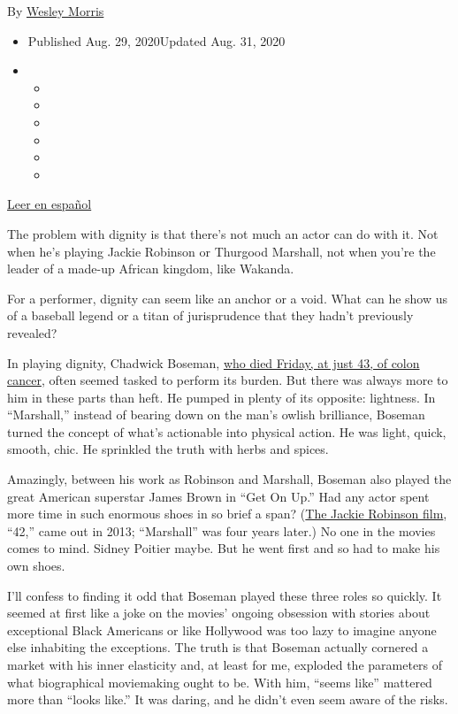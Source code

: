 By \href{https://www.nytimes3xbfgragh.onion/by/wesley-morris}{Wesley
Morris}

\begin{itemize}
\item
  Published Aug. 29, 2020Updated Aug. 31, 2020
\item
  \begin{itemize}
  \item
  \item
  \item
  \item
  \item
  \item
  \end{itemize}
\end{itemize}

\href{https://www.nytimes3xbfgragh.onion/es/2020/09/01/espanol/cultura/chadwick-boseman.html}{Leer
en español}

The problem with dignity is that there's not much an actor can do with
it. Not when he's playing Jackie Robinson or Thurgood Marshall, not when
you're the leader of a made-up African kingdom, like Wakanda.

For a performer, dignity can seem like an anchor or a void. What can he
show us of a baseball legend or a titan of jurisprudence that they
hadn't previously revealed?

In playing dignity, Chadwick Boseman,
\href{https://www.nytimes3xbfgragh.onion/2020/08/28/movies/chadwick-boseman-dead.html}{who
died Friday, at just 43, of colon cancer}, often seemed tasked to
perform its burden. But there was always more to him in these parts than
heft. He pumped in plenty of its opposite: lightness. In ``Marshall,''
instead of bearing down on the man's owlish brilliance, Boseman turned
the concept of what's actionable into physical action. He was light,
quick, smooth, chic. He sprinkled the truth with herbs and spices.

Amazingly, between his work as Robinson and Marshall, Boseman also
played the great American superstar James Brown in ``Get On Up.'' Had
any actor spent more time in such enormous shoes in so brief a span?
(\href{https://www.nytimes3xbfgragh.onion/2013/04/12/movies/42-with-chadwick-boseman-as-jackie-robinson.html}{The
Jackie Robinson film}, ``42,'' came out in 2013; ``Marshall'' was four
years later.) No one in the movies comes to mind. Sidney Poitier maybe.
But he went first and so had to make his own shoes.

I'll confess to finding it odd that Boseman played these three roles so
quickly. It seemed at first like a joke on the movies' ongoing obsession
with stories about exceptional Black Americans or like Hollywood was too
lazy to imagine anyone else inhabiting the exceptions. The truth is that
Boseman actually cornered a market with his inner elasticity and, at
least for me, exploded the parameters of what biographical moviemaking
ought to be. With him, ``seems like'' mattered more than ``looks like.''
It was daring, and he didn't even seem aware of the risks.

